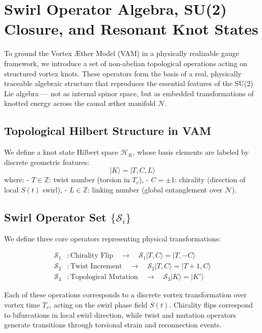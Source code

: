 \section{Swirl Operator Algebra, SU(2) Closure, and Resonant Knot States}

To ground the Vortex \AE{}ther Model (VAM) in a physically realizable gauge framework, we introduce a set of non-abelian topological operations acting on structured vortex knots. These operators form the basis of a real, physically traceable algebraic structure that reproduces the essential features of the SU(2) Lie algebra — not as internal spinor space, but as embedded transformations of knotted energy across the causal æther manifold \( \mathcal{N} \).

\subsection*{Topological Hilbert Structure in VAM}

We define a knot state Hilbert space \( \mathcal{H}_K \), whose basis elements are labeled by discrete geometric features:
\[
|K\rangle = |T, C, L\rangle
\]
where:
- \( T \in \mathbb{Z} \): twist number (torsion in $T_v$),
- \( C = \pm 1 \): chirality (direction of local $S(t)$ swirl),
- \( L \in \mathbb{Z} \): linking number (global entanglement over $\mathcal{N}$).

\subsection*{Swirl Operator Set \(\{\mathcal{S}_i\}\)}

We define three core operators representing physical transformations:

\begin{align}
\mathcal{S}_1 &: \text{Chirality Flip} \quad\rightarrow\quad \mathcal{S}_1 |T, C\rangle = |T, -C\rangle \\
\mathcal{S}_2 &: \text{Twist Increment} \quad\rightarrow\quad \mathcal{S}_2 |T, C\rangle = |T+1, C\rangle \\
\mathcal{S}_3 &: \text{Topological Mutation} \quad\rightarrow\quad \mathcal{S}_3 |K\rangle = |K'\rangle
\end{align}

Each of these operations corresponds to a discrete vortex transformation over vortex time \( T_v \), acting on the swirl phase field \( S(t) \). Chirality flips correspond to bifurcations in local swirl direction, while twist and mutation operators generate transitions through torsional strain and reconnection events.

